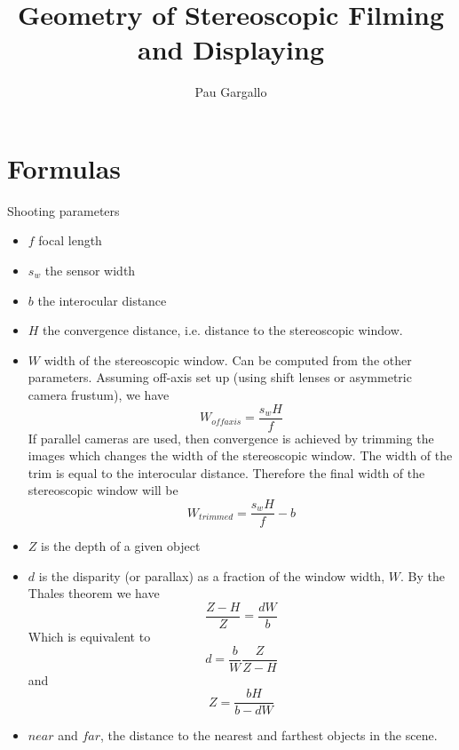 \documentclass[12pt,a4paper]{article}
\begin{document}
\title{Geometry of Stereoscopic Filming and Displaying}
\author{Pau Gargallo}
\maketitle

\section{Formulas}
Shooting parameters
\begin{itemize}
 \item $f$ focal length
 \item $s_w$ the sensor width
 \item $b$ the interocular distance
 \item $H$ the convergence distance, i.e. distance to the stereoscopic window.
 \item $W$ width of the stereoscopic window. Can be computed from the other parameters. Assuming off-axis set up (using shift lenses or asymmetric camera frustum), we have
 \begin{equation}
  W_{offaxis} = \frac{s_w H}{f}
 \end{equation}
 If parallel cameras are used, then convergence is achieved by trimming the images which changes the width of the stereoscopic window. The width of the trim is equal to the interocular distance. Therefore the final width of the stereoscopic window will be
 \begin{equation}
  W_{trimmed} = \frac{s_w H}{f} - b
 \end{equation}
 \item $Z$ is the depth of a given object
 \item $d$ is the disparity (or parallax) as a fraction of the window width, $W$.  By the Thales theorem we have
 \begin{equation}
  \frac{Z - H}{Z} = \frac{dW}{b}
 \end{equation}
 Which is equivalent to
 \begin{equation}
  d = \frac{b}{W} \frac{Z}{Z-H}
 \end{equation}
 and
 \begin{equation}
  Z = \frac{bH}{b - dW}
 \end{equation} 	
 \item $near$ and $far$, the distance to the nearest and farthest objects in the scene.
 
\end{itemize}
\end{document}
